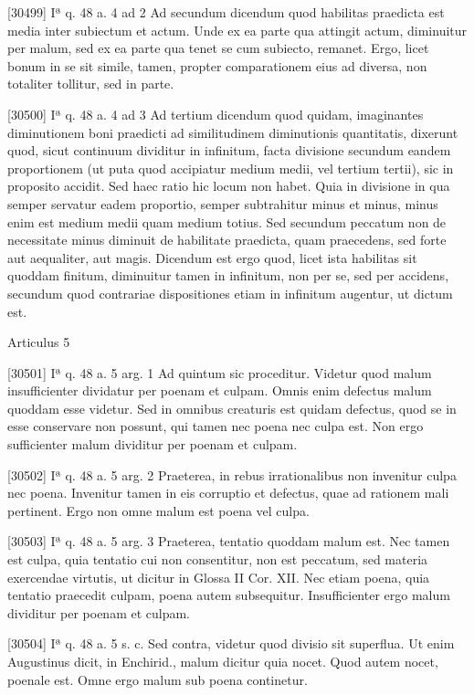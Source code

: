 \documentclass[paper=a4paper,fontsize=10pt,jafontsize=9pt,titlepage]{jlreq}
\begin{document}
[30499] Iª q. 48 a. 4 ad 2 Ad secundum dicendum quod habilitas praedicta est media inter subiectum et actum. Unde ex ea parte qua attingit actum, diminuitur per malum, sed ex ea parte qua tenet se cum subiecto, remanet. Ergo, licet bonum in se sit simile, tamen, propter comparationem eius ad diversa, non totaliter tollitur, sed in parte.

[30500] Iª q. 48 a. 4 ad 3 Ad tertium dicendum quod quidam, imaginantes diminutionem boni praedicti ad similitudinem diminutionis quantitatis, dixerunt quod, sicut continuum dividitur in infinitum, facta divisione secundum eandem proportionem (ut puta quod accipiatur medium medii, vel tertium tertii), sic in proposito accidit. Sed haec ratio hic locum non habet. Quia in divisione in qua semper servatur eadem proportio, semper subtrahitur minus et minus, minus enim est medium medii quam medium totius. Sed secundum peccatum non de necessitate minus diminuit de habilitate praedicta, quam praecedens, sed forte aut aequaliter, aut magis. Dicendum est ergo quod, licet ista habilitas sit quoddam finitum, diminuitur tamen in infinitum, non per se, sed per accidens, secundum quod contrariae dispositiones etiam in infinitum augentur, ut dictum est.

Articulus 5

[30501] Iª q. 48 a. 5 arg. 1 Ad quintum sic proceditur. Videtur quod malum insufficienter dividatur per poenam et culpam. Omnis enim defectus malum quoddam esse videtur. Sed in omnibus creaturis est quidam defectus, quod se in esse conservare non possunt, qui tamen nec poena nec culpa est. Non ergo sufficienter malum dividitur per poenam et culpam.

[30502] Iª q. 48 a. 5 arg. 2 Praeterea, in rebus irrationalibus non invenitur culpa nec poena. Invenitur tamen in eis corruptio et defectus, quae ad rationem mali pertinent. Ergo non omne malum est poena vel culpa.

[30503] Iª q. 48 a. 5 arg. 3 Praeterea, tentatio quoddam malum est. Nec tamen est culpa, quia tentatio cui non consentitur, non est peccatum, sed materia exercendae virtutis, ut dicitur in Glossa II Cor. XII. Nec etiam poena, quia tentatio praecedit culpam, poena autem subsequitur. Insufficienter ergo malum dividitur per poenam et culpam.

[30504] Iª q. 48 a. 5 s. c. Sed contra, videtur quod divisio sit superflua. Ut enim Augustinus dicit, in Enchirid., malum dicitur quia nocet. Quod autem nocet, poenale est. Omne ergo malum sub poena continetur.
\end{document}
